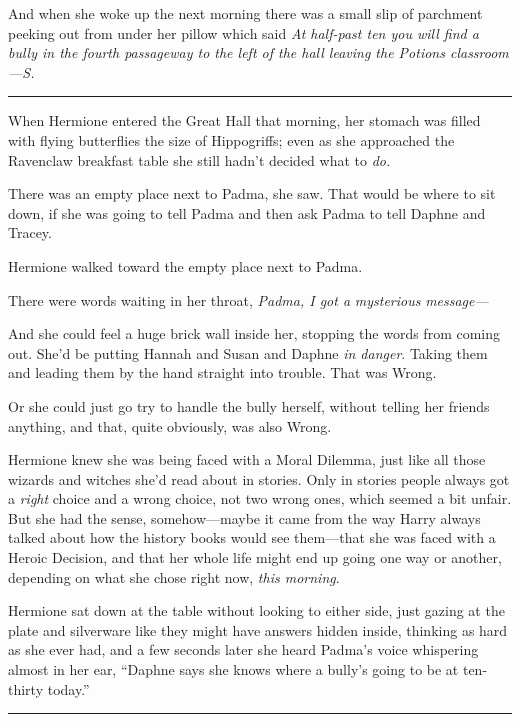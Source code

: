 And when she woke up the next morning there was a small slip of
parchment peeking out from under her pillow which said \emph{At
half-past ten you will find a bully in the fourth passageway to the left
of the hall leaving the Potions classroom---S.}

\begin{center}\rule{3in}{0.4pt}\end{center}

When Hermione entered the Great Hall that morning, her stomach was
filled with flying butterflies the size of Hippogriffs; even as she
approached the Ravenclaw breakfast table she still hadn't decided what
to \emph{do.}

There was an empty place next to Padma, she saw. That would be where to
sit down, if she was going to tell Padma and then ask Padma to tell
Daphne and Tracey.

Hermione walked toward the empty place next to Padma.

There were words waiting in her throat, \emph{Padma, I got a}
\emph{mysterious} \emph{message---}

And she could feel a huge brick wall inside her, stopping the words from
coming out. She'd be putting Hannah and Susan and Daphne \emph{in
danger}. Taking them and leading them by the hand straight into trouble.
That was Wrong.

Or she could just go try to handle the bully herself, without telling
her friends anything, and that, quite obviously, was also Wrong.

Hermione knew she was being faced with a Moral Dilemma, just like all
those wizards and witches she'd read about in stories. Only in stories
people always got a \emph{right} choice and a wrong choice, not two
wrong ones, which seemed a bit unfair. But she had the sense,
somehow---maybe it came from the way Harry always talked about how the
history books would see them---that she was faced with a Heroic
Decision, and that her whole life might end up going one way or another,
depending on what she chose right now, \emph{this morning}.

Hermione sat down at the table without looking to either side, just
gazing at the plate and silverware like they might have answers hidden
inside, thinking as hard as she ever had, and a few seconds later she
heard Padma's voice whispering almost in her ear, ``Daphne says she
knows where a bully's going to be at ten-thirty today.''

\begin{center}\rule{3in}{0.4pt}\end{center}

